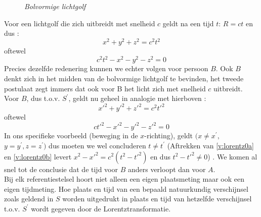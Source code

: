 
\begin{figure}[ht]
\centering
\caption{{\sl Bolvormige lichtgolf}}
\label{f:lorentz1}
\end{figure}


Voor een lichtgolf die zich uitbreidt met snelheid $c$ geldt na een tijd $t$: 
$R = ct$ en dus :
\begin{displaymath}
x^{2} + y^{2} + z^{2} = c^{2}t^{2}
\end{displaymath}
oftewel
\begin{equation}
\label{v:lorentz0a}
c^2 t^2 - x^{2} - y^{2} - z^{2} = 0
\end{equation}
Precies dezelfde redenering kunnen we echter volgen voor persoon $B$.
Ook $B$ denkt zich in het midden van de bolvormige lichtgolf te bevinden, het 
tweede postulaat zegt immers dat ook voor B het licht zich met snelheid $c$ 
uitbreidt.
Voor $B$, dus t.o.v. $S^{'}$, geldt nu geheel in analogie met hierboven :
\begin{displaymath}
x'^{2} + y'^{2} + z'^{2} = c^{2}t'^{2}
\end{displaymath}
oftewel
\begin{equation}
\label{v:lorentz0b}
c t'^2 - x'^{2} - y'^{2} - z'^{2} = 0
\end{equation}
In ons specifieke voorbeeld (beweging in de $x$-richting), geldt 
$(x \neq x^{'},$\newline $y = y^{'}, z = z^{'})$ dus moeten we wel concluderen 
$t \neq t^{'}$ (Aftrekken van \ref{v:lorentz0a} en \ref{v:lorentz0b} levert
$x^{2} - x'^{2} = c^{2}(t^{2} - t'^{2})$ en dus $t^{2} - t'^{2} \neq 0$) .
We komen al snel tot de conclusie dat de tijd voor $B$ anders 
verloopt dan voor $A$.\\
Bij elk referentiestelsel hoort niet alleen een eigen plaatsmeting maar 
ook een eigen tijdmeting.
Hoe plaats en tijd van een bepaald natuurkundig verschijnsel zoals geldend 
in $S$ worden uitgedrukt in plaats en tijd van hetzelfde verschijnsel 
t.o.v. $S^{'}$ wordt gegeven door de Lorentztransformatie.

